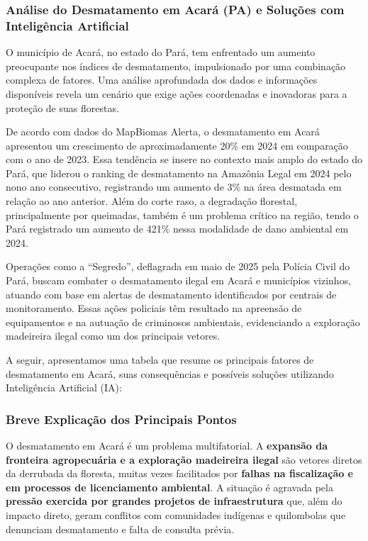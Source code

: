 \documentclass[12pt, a4paper, onecolumn, notitlepage]{article}
\begin{document}
    \subsubsection*{Análise do Desmatamento em Acará (PA) e Soluções com Inteligência Artificial}

    O município de Acará, no estado do Pará, tem enfrentado um aumento preocupante nos índices de desmatamento, impulsionado por uma combinação complexa de fatores. Uma análise aprofundada dos dados e informações disponíveis revela um cenário que exige ações coordenadas e inovadoras para a proteção de suas florestas.

    De acordo com dados do MapBiomas Alerta, o desmatamento em Acará apresentou um crescimento de aproximadamente 20\% em 2024 em comparação com o ano de 2023. Essa tendência se insere no contexto mais amplo do estado do Pará, que liderou o ranking de desmatamento na Amazônia Legal em 2024 pelo nono ano consecutivo, registrando um aumento de 3\% na área desmatada em relação ao ano anterior. Além do corte raso, a degradação florestal, principalmente por queimadas, também é um problema crítico na região, tendo o Pará registrado um aumento de 421\% nessa modalidade de dano ambiental em 2024.

    Operações como a ``Segredo'', deflagrada em maio de 2025 pela Polícia Civil do Pará, buscam combater o desmatamento ilegal em Acará e municípios vizinhos, atuando com base em alertas de desmatamento identificados por centrais de monitoramento. Essas ações policiais têm resultado na apreensão de equipamentos e na autuação de criminosos ambientais, evidenciando a exploração madeireira ilegal como um dos principais vetores.

    A seguir, apresentamos uma tabela que resume os principais fatores de desmatamento em Acará, suas consequências e possíveis soluções utilizando Inteligência Artificial (IA):

    \subsubsection*{Breve Explicação dos Principais Pontos}
    O desmatamento em Acará é um problema multifatorial. A \textbf{expansão da fronteira agropecuária  e a exploração madeireira ilegal}  são vetores diretos da derrubada da floresta, muitas vezes facilitados por \textbf{falhas na fiscalização e em processos de licenciamento ambiental}. A situação é agravada pela \textbf{pressão exercida por grandes projetos de infraestrutura} que, além do impacto direto, geram conflitos com comunidades indígenas e quilombolas que denunciam desmatamento e falta de consulta prévia.
\end{document}
